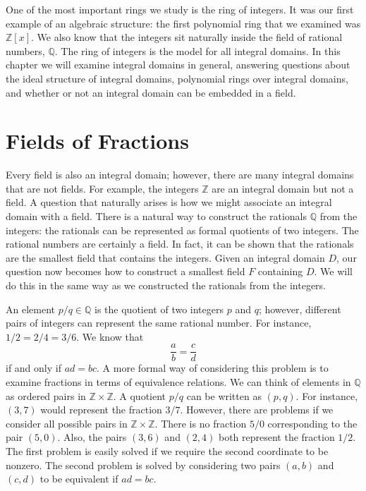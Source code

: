  
One of the most important rings we study is the ring of integers.  It was our first example of an algebraic structure: the first polynomial
ring that we examined was ${\mathbb Z}[x]$.  We also know that the integers sit naturally inside the field of rational numbers, ${\mathbb
Q}$.  The ring of integers is the model for all integral domains.  In this chapter we will examine integral domains in general, answering
questions about the ideal structure of integral domains, polynomial rings over integral domains, and whether or not an integral domain can
be embedded in a field.
 

\section{Fields of Fractions}

Every field is also an integral domain; however, there are many integral domains that are not fields.  For example, the integers ${\mathbb Z}$ are an integral domain but not a field.  A question that naturally arises is how we might associate an integral domain with a field.  There is a natural way to construct the rationals ${\mathbb Q}$ from the integers: the rationals can be represented as formal quotients of two integers.  The rational numbers are certainly a field.  In fact, it can be shown that the rationals are the smallest field that contains the integers.  Given an integral domain $D$, our question now becomes how to construct a smallest field $F$ containing $D$.  We will do this in the same way as we constructed the rationals from the integers.  

An element $p/q \in {\mathbb Q}$ is the quotient of two integers $p$ and $q$; however, different pairs of integers can represent the same
rational number.  For instance, $1/2 = 2/4 = 3/6$. We know that 
\[
\frac{a}{b} = \frac{c}{d}
\]
if and only if $ad = bc$. A more formal way of considering this problem is to examine fractions in terms of equivalence relations.  We can think of elements in ${\mathbb Q}$ as ordered pairs in ${\mathbb Z} \times {\mathbb Z}$.  A quotient $p/q$ can be written as $(p, q)$.  For instance, $(3, 7)$ would represent the fraction $3/7$.  However, there are problems if we consider all possible pairs in ${\mathbb Z} \times {\mathbb Z}$.  There is no fraction $5/0$ corresponding to the pair $(5,0)$.  Also, the pairs $(3,6)$ and $(2,4)$ both represent the fraction $1/2$.  The first problem is easily solved if we require the second coordinate to be nonzero.  The second problem is solved by considering two pairs $(a, b)$ and $(c, d)$ to be equivalent if $ad = bc$.

